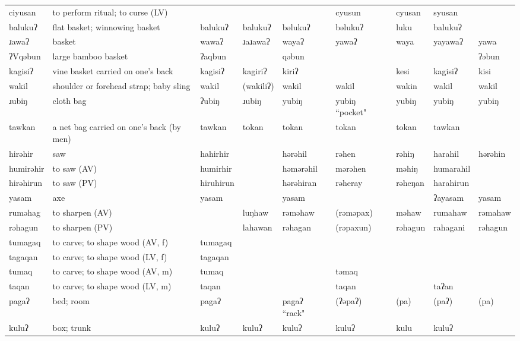 \begin{landscape}
\begin{longtable}{*{9}{>{\raggedright\arraybackslash}p{}}}
\text{*}ciyusan & to perform ritual; to curse (LV) &  &  &  & cyusun & cyusan & syusan & \\
\text{*}balukuʔ & flat basket; winnowing basket & balukuʔ & balukuʔ & bəlukuʔ & bəlukuʔ & luku & balukuʔ & \\
\text{*}ɹawaʔ & basket & wawaʔ & ɹaɹawaʔ & wayaʔ & yawaʔ & waya & yayawaʔ & yawa\\
\text{*}ʔVqəbun & large bamboo basket & ʔaqbun &  & qəbun &  &  &  & ʔəbun\\
\text{*}kagisiʔ & vine basket carried on one's back & kagisiʔ & kagiriʔ & kiriʔ &  & kesi & kagisiʔ & kisi\\
\text{*}wakil & shoulder or forehead strap; baby sling & wakil & (wakiliʔ) & wakil & wakil & wakin & wakil & wakil\\
\text{*}ɹubiŋ & cloth bag & ʔubiŋ & ɹubiŋ & yubiŋ & yubiŋ ``pocket" & yubiŋ & yubiŋ & yubiŋ\\
\text{*}tawkan & a net bag carried on one's back (by men) & tawkan & tokan & tokan & tokan & tokan & tawkan & \\
\text{*}hirəhir & saw & hahirhir &  & hərəhil & rəhen & rəhiŋ & harahil & hərəhin\\
\text{*}humirəhir & to saw (AV) & humirhir &  & həmərəhil & mərəhen & məhiŋ & humarahil & \\
\text{*}hirəhirun & to saw (PV) & hiruhirun &  & hərəhiran & rəheray & rəheŋan & harahirun & \\
\text{*}yasam & axe & yasam &  & yasam &  &  & ʔayasam & yasam\\
\text{*}ruməhag & to sharpen (AV) &  & luŋhaw & rəməhaw & (rəməpax) & məhaw & rumahaw & rəmahaw\\
\text{*}rəhagun & to sharpen (PV) &  & lahawan & rəhagan & (rəpaxun) & rəhagun & rahagani & rəhagun\\
\text{*}tumagaq & to carve; to shape wood (AV, f) & tumagaq &  &  &  &  &  & \\
\text{*}tagaqan & to carve; to shape wood (LV, f) & tagaqan &  &  &  &  &  & \\
\text{*}tumaq & to carve; to shape wood (AV, m) & tumaq &  &  & təmaq &  &  & \\
\text{*}taqan & to carve; to shape wood (LV, m) & taqan &  &  & taqan &  & taʔan & \\
\text{*}pagaʔ & bed; room & pagaʔ &  & pagaʔ ``rack" & (ʔəpaʔ) & (pa) & (paʔ) & (pa)\\
\text{*}kuluʔ & box; trunk & kuluʔ & kuluʔ & kuluʔ & kuluʔ & kulu & kuluʔ & \\

\end{longtable}
\end{landscape}
